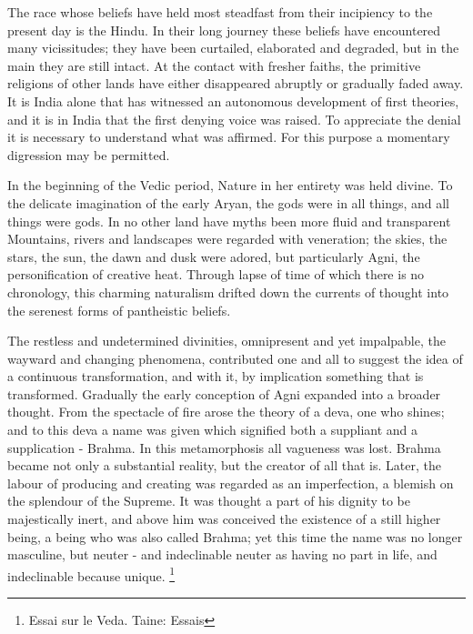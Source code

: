 \documentclass[]{book}
\let\rmarkdownfootnote\footnote%
\def\footnote{\protect\rmarkdownfootnote}
\begin{document}
The race whose beliefs have held most steadfast from their incipiency to
the present day is the Hindu. In their long journey these beliefs have
encountered many vicissitudes; they have been curtailed, elaborated and
degraded, but in the main they are still intact. At the contact with
fresher faiths, the primitive religions of other lands have either
disappeared abruptly or gradually faded away. It is India alone that has
witnessed an autonomous development of first theories, and it is in
India that the first denying voice was raised. To appreciate the denial
it is necessary to understand what was affirmed. For this purpose a
momentary digression may be permitted.

In the beginning of the Vedic period, Nature in her entirety was held
divine. To the delicate imagination of the early Aryan, the gods were in
all things, and all things were gods. In no other land have myths been
more fluid and transparent Mountains, rivers and landscapes were
regarded with veneration; the skies, the stars, the sun, the dawn and
dusk were adored, but particularly Agni, the personification of creative
heat. Through lapse of time of which there is no chronology, this
charming naturalism drifted down the currents of thought into the
serenest forms of pantheistic beliefs.

The restless and undetermined divinities, omnipresent and yet
impalpable, the wayward and changing phenomena, contributed one and all
to suggest the idea of a continuous transformation, and with it, by
implication something that is transformed. Gradually the early
conception of Agni expanded into a broader thought. From the spectacle
of fire arose the theory of a deva, one who shines; and to this deva a
name was given which signified both a suppliant and a supplication -
Brahma. In this metamorphosis all vagueness was lost. Brahma became not
only a substantial reality, but the creator of all that is. Later, the
labour of producing and creating was regarded as an imperfection, a
blemish on the splendour of the Supreme. It was thought a part of his
dignity to be majestically inert, and above him was conceived the
existence of a still higher being, a being who was also called Brahma;
yet this time the name was no longer masculine, but neuter - and
indeclinable neuter as having no part in life, and indeclinable because
unique. \footnote{Essai sur le Veda. Taine: Essais}
\end{document}

